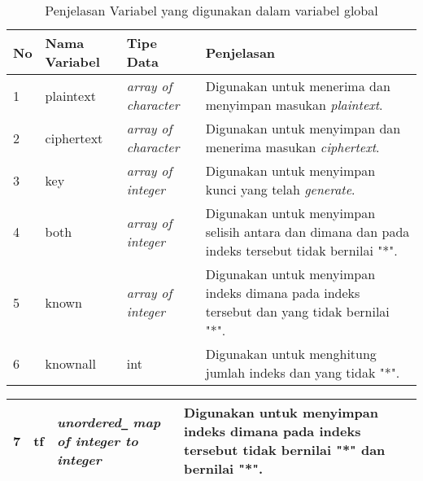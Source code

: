 \begin{minipage}{\linewidth}

\end{minipage} 

\begin{table}[H]
	 	\caption{Penjelasan Variabel yang digunakan dalam variabel global}
		\begin{tabular}   {|p{0.5cm}|p{2.5cm}|p{2cm}|p{4cm}|}\hline
		No&Nama Variabel&Tipe Data&Penjelasan \\ \hline
		1&plaintext&\textit{array of character}&Digunakan untuk menerima dan  menyimpan masukan \textit{plaintext}. \\ \hline
		2&ciphertext&\textit{array of character}&Digunakan untuk menyimpan dan menerima masukan \textit{ciphertext}. \\ \hline
		3&key&\textit{array of integer}&Digunakan untuk menyimpan kunci yang telah \textit{generate}. \\ \hline
		4&both&\textit{array of integer}&Digunakan untuk menyimpan selisih antara \plaintext dan \ciphertext dimana \plaintext dan \ciphertext pada indeks tersebut tidak bernilai "*". \\ \hline
		5&known&\textit{array of integer} &Digunakan untuk menyimpan indeks dimana pada indeks tersebut \plaintext dan \ciphertext yang tidak bernilai "*". \\ \hline
		6&knownall&int&Digunakan untuk menghitung jumlah indeks \plaintext dan \ciphertext yang tidak "*". \\ \hline
		\end{tabular}%
		\label{tab:mainvar}
	\end{table}
	
	\begin{table}[H]
		\begin{tabular}   {|p{0.5cm}|p{2.5cm}|p{2cm}|p{4cm}|}\hline
		7&tf&\textit{unordered}\verb|_| \textit{map} \textit{of integer to integer}&Digunakan untuk menyimpan indeks dimana pada indeks tersebut \ciphertext tidak bernilai "*" dan \plaintext bernilai "*". \\ \hline
		\end{tabular}%
		\label{tab:mainvar}
	\end{table}	
	
